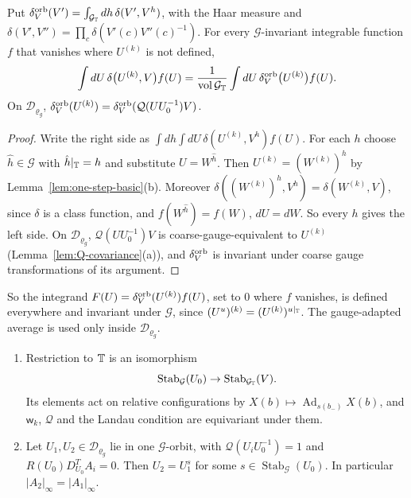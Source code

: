 \begin{lemma}\label{lem:ol-smearing}
Put $\delta^{\rm orb}_V(V')=\int_{\mathcal G_\mathbb T}dh\,\delta(V',V^h)$, with the Haar measure and $\delta(V',V'')=\prod_c\delta(V'(c)V''(c)^{-1})$. For every $\mathcal G$-invariant integrable function $f$ that vanishes where $U^{(k)}$ is not defined,
\[
\int dU\,\delta\big(U^{(k)},V\big)f(U)=\frac1{\operatorname{vol}\mathcal G_\mathbb T}\int dU\,\delta^{\rm orb}_V\big(U^{(k)}\big)f(U).
\]
On $\mathcal D_{\varrho_g}$, $\delta^{\rm orb}_V(U^{(k)})=\delta^{\rm orb}_V(\mathcal Q(UU_0^{-1})V)$.
\end{lemma}

\begin{proof}
Write the right side as $\int dh\int dU\,\delta(U^{(k)},V^h)f(U)$. For each $h$ choose $\hat h\in\mathcal G$ with $\hat h|_\mathbb T=h$ and substitute $U=W^{\hat h}$. Then $U^{(k)}=(W^{(k)})^h$ by Lemma~\ref{lem:one-step-basic}(b). Moreover $\delta((W^{(k)})^h,V^h)=\delta(W^{(k)},V)$, since $\delta$ is a class function, and $f(W^{\hat h})=f(W)$, $dU=dW$. So every $h$ gives the left side. On $\mathcal D_{\varrho_g}$, $\mathcal Q(UU_0^{-1})V$ is coarse-gauge-equivalent to $U^{(k)}$ (Lemma~\ref{lem:Q-covariance}(a)), and $\delta^{\rm orb}_V$ is invariant under coarse gauge transformations of its argument.
\end{proof}

So the integrand $F(U)=\delta^{\rm orb}_V(U^{(k)})f(U)$, set to $0$ where $f$ vanishes, is defined everywhere and invariant under $\mathcal G$, since $(U^u)^{(k)}=(U^{(k)})^{u|_\mathbb T}$. The gauge-adapted average is used only inside $\mathcal D_{\varrho_g}$.

\begin{lemma}\label{lem:ol-slice}
\begin{enumerate}[label=(\alph*)]
\item Restriction to $\mathbb T$ is an isomorphism
\[
\operatorname{Stab}_{\mathcal G}(U_0)\to\operatorname{Stab}_{\mathcal G_\mathbb T}(V).
\]
Its elements act on relative configurations by $X(b)\mapsto\operatorname{Ad}_{s(b_-)}X(b)$, and $\mathsf w_k$, $\mathcal Q$ and the Landau condition are equivariant under them.
\item Let $U_1,U_2\in\mathcal D_{\varrho_g}$ lie in one $\mathcal G$-orbit, with $\mathcal Q(U_iU_0^{-1})=1$ and $R(U_0)D^T_{U_0}A_i=0$. Then $U_2=U_1^{s}$ for some $s\in\operatorname{Stab}_{\mathcal G}(U_0)$. In particular $|A_2|_\infty=|A_1|_\infty$.
\end{enumerate}
\end{lemma}

